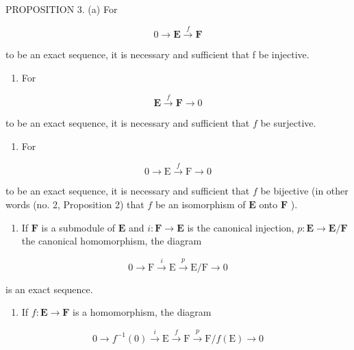 PROPOSITION 3. (a) For

\[
0 \longrightarrow \mathbf {E} \stackrel {f} {\longrightarrow} \mathbf {F}
\]

to be an exact sequence, it is necessary and sufficient that f be injective.

\begin{enumerate}
\def\labelenumi{(\alph{enumi})}
\setcounter{enumi}{1}
\tightlist
\item
  For
\end{enumerate}

\[
\mathbf {E} \xrightarrow {f} \mathbf {F} \longrightarrow 0
\]

to be an exact sequence, it is necessary and sufficient that \(f\) be surjective.

\begin{enumerate}
\def\labelenumi{(\alph{enumi})}
\setcounter{enumi}{2}
\tightlist
\item
  For
\end{enumerate}

\[
0 \longrightarrow \mathrm{E} \stackrel {f} {\longrightarrow} \mathrm{F} \longrightarrow 0
\]

to be an exact sequence, it is necessary and sufficient that \(f\) be bijective (in other words (no. 2, Proposition 2) that \(f\) be an isomorphism of \(\mathbf{E}\) onto \(\mathbf{F}\) ).

\begin{enumerate}
\def\labelenumi{(\alph{enumi})}
\setcounter{enumi}{3}
\tightlist
\item
  If \(\mathbf{F}\) is a submodule of \(\mathbf{E}\) and \(i: \mathbf{F} \to \mathbf{E}\) is the canonical injection, \(p: \mathbf{E} \to \mathbf{E} / \mathbf{F}\) the canonical homomorphism, the diagram
\end{enumerate}

\[
0 \longrightarrow \mathrm{F} \stackrel {i} {\longrightarrow} \mathrm{E} \stackrel {p} {\longrightarrow} \mathrm{E} / \mathrm{F} \longrightarrow 0\tag{14}
\]

is an exact sequence.

\begin{enumerate}
\def\labelenumi{(\alph{enumi})}
\setcounter{enumi}{4}
\tightlist
\item
  If \(f: \mathbf{E} \to \mathbf{F}\) is a homomorphism, the diagram
\end{enumerate}

\[
0 \longrightarrow f ^ {- 1} (0) \stackrel {i} {\longrightarrow} \mathrm{E} \stackrel {f} {\longrightarrow} \mathrm{F} \stackrel {p} {\longrightarrow} \mathrm{F} / f (\mathrm{E}) \rightarrow 0
\]


